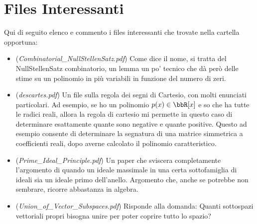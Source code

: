 \documentclass[a4paper,NoNotes,GeneralMath]{stdmdoc}
\theoremstyle{definition}
\begin{document}
	\section {Files Interessanti}
	Qui di seguito elenco e commento i files interessanti che trovate nella cartella opportuna:
	\begin{itemize}
		\item ({\it Combinatorial\_NullStellenSatz.pdf}) Come dice il nome, si tratta del NullStellenSatz combinatorio, un lemma un po' tecnico che dà però delle stime su un polinomio in più variabili in funzione del numero di zeri.
		\item ({\it descartes.pdf}) Un file sulla regola dei segni di Cartesio, con molti enunciati particolari. Ad esempio, se ho un polinomio $p(x) \in \bbR[x]$ e so che ha tutte le radici reali, allora la regola di cartesio mi permette in questo caso di determinare esattamente quante sono negative e quante positive. Questo ad esempio consente di determinare la segnatura di una matrice simmetrica a coefficienti reali, dopo averne calcolato il polinomio caratteristico.
		\item ({\it Prime\_Ideal\_Principle.pdf}) Un paper che sviscera completamente l'argomento di quando un ideale massimale in una certa sottofamiglia di ideali sia un ideale primo dell'anello. Argomento che, anche se potrebbe non sembrare, ricorre abbastanza in algebra.
		\item ({\it Union\_of\_Vector\_Subspaces.pdf}) Risponde alla domanda: Quanti sottospazi vettoriali propri bisogna unire per poter coprire tutto lo spazio?
	\end{itemize}
	
\end{document}

